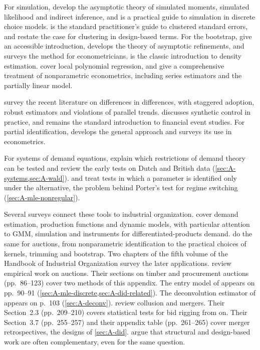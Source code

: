 For simulation, \citet{GourierouxMonfort1996} develop the asymptotic theory of simulated moments, simulated likelihood
and indirect inference, and \citet{Train2009} is a practical guide to simulation in discrete choice models.
\citet{CameronMiller2015} is the standard practitioner's guide to clustered standard errors, and \citet{AbadieEtAl2023}
restate the case for clustering in design-based terms. For the bootstrap, \citet{EfronTibshirani1993} give an
accessible introduction, \citet{Hall1992} develops the theory of asymptotic refinements, and \citet{Horowitz2001}
surveys the method for econometricians. \citet{Silverman1986} is the classic introduction to density estimation.
\citet{FanGijbels1996} cover local polynomial regression, and \citet{LiRacine2007} give a comprehensive treatment of
nonparametric econometrics, including series estimators and the partially linear model.

\citet{RothEtAl2023} survey the recent literature on differences in differences, with staggered adoption, robust
estimators and violations of parallel trends. \citet{Abadie2021} discusses synthetic control in practice, and
\citet{MacKinlay1997} remains the standard introduction to financial event studies. For partial identification,
\citet{Manski2003} develops the general approach and \citet{Tamer2010} surveys its use in econometrics.

For systems of demand equations, \citet[Section~3.3, pp.~67--75]{DeatonMuellbauer1980b} explain which restrictions
of demand theory can be tested and review the early tests on Dutch and British data (\cref{sec:A-systems,sec:A-wald}).
\citet{Davies1977} and \citet{Hansen1992} treat tests in which a parameter is identified only under the alternative,
the problem behind Porter's test for regime switching (\cref{sec:A-mle-nonregular}).

Several surveys connect these tools to industrial organization. \citet{AckerbergEtAl2007} cover demand estimation,
production functions and dynamic models, with particular attention to GMM, simulation and instruments for
differentiated-products demand. \citet{AtheyHaile2007} do the same for auctions, from nonparametric identification to
the practical choices of kernels, trimming and bootstrap. Two chapters of the fifth volume of the Handbook of
Industrial Organization \citep{HoHortacsuLizzeri2021} survey the later applications. \citet{HortacsuPerrigne2021}
review empirical work on auctions. Their sections on timber and procurement auctions (pp.~86--123) cover two methods
of this appendix. The entry model of \citet{AtheyLevinSeira2011} appears on pp.~90--91
(\cref{sec:A-mle-discrete,sec:A-did-related}). The deconvolution estimator of \citet{Krasnokutskaya2011} appears on
p.~103 (\cref{sec:A-deconv}). \citet{AskerNocke2021} review collusion and
mergers. Their Section~2.3 (pp.~209--210) covers statistical tests for bid rigging from \citet{PorterZona1993} on.
Their Section~3.7 (pp.~255--257) and their appendix table (pp.~261--265) cover merger retrospectives, the designs
of \cref{sec:A-did}.
\citet[p.~158]{EinavLevin2010} argue that structural and design-based work are often complementary, even for the same
question.

